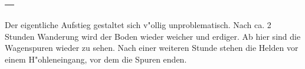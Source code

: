 \begin{longtable}{|p{15cm}|}
\begin{description}
\end{description}\\
\hline
\end{longtable}
\par Der eigentliche Aufstieg gestaltet sich v"ollig unproblematisch. Nach ca. 2 Stunden Wanderung wird der Boden wieder weicher und erdiger. Ab hier sind die Wagenspuren wieder zu sehen. Nach einer weiteren Stunde stehen die Helden vor einem H"ohleneingang, vor dem die Spuren enden.